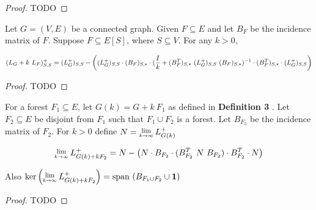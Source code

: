 \begin{proof}
 TODO
\end{proof}

\begin{HXc}
 Let $G = (V, E)$ be a connected graph. Given $F \subseteq E$ and let $B_F$ be the incidence matrix of $F$. Suppose $F \subseteq E[S]$, where $S \subseteq V$. For any $k > 0$,
 
  $$ (L_G + k \ L_F)^+_{S,S} = (L_{G}^{+})_{S,S} - \left((L_{G}^{+})_{S,S} \cdot (B_F)_{S,*} \cdot (\frac{I}{k} + (B_F^T)_{S,*} \ (L_{G}^{+})_{S,S} \ (B_F)_{S,*})^{-1} \cdot (B_F^T)_{S,*} \cdot (L_{G}^{+} )_{S,S} \right)$$
 
\end{HXc}
\begin{proof}
 TODO
\end{proof}

\begin{HXt}
 For a forest $F_1 \subseteq E$, let $G(k) = G + k \ F_1$ as defined in \textbf{Definition 3} . Let $F_2 \subseteq E$ be disjoint from $F_1$ such that $F_1 \cup F_2$ is a forest. Let $B_{F_2}$ be the incidence matrix of $F_2$. For $k > 0$ define $N = \Lim{k \to \infty} \laplacian[G(k)]$

 $$ \Lim{k \to \infty} \laplacian[G(k) + kF_2] = N - \left( N \cdot B_{F_2} \cdot (B_{F_2}^T \ N \ B_{F_2}) \cdot B_{F_2}^T \cdot N \right)$$ 

 Also $\text{ker} \left( \Lim{k \to \infty} \laplacian[G(k) + kF_2] \right) = \text{span }(B_{F_1 \cup F_2} \cup \textbf{1})$
 \end{HXt}



\begin{proof}
 TODO
\end{proof}






